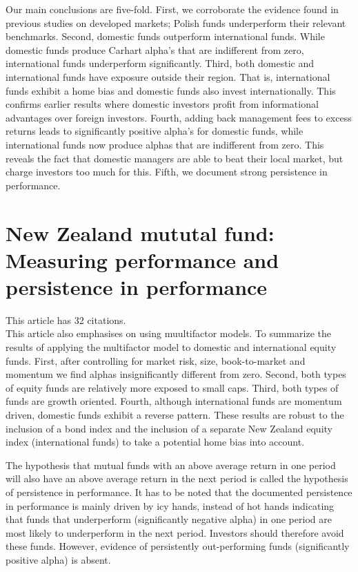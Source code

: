 \documentclass[12 pt]{article}
\begin{document}
\par Our main conclusions are five-fold. First, we corroborate the evidence found in previous studies on developed markets; Polish funds underperform their relevant benchmarks. Second, domestic funds outperform international funds. While domestic funds produce Carhart alpha's that are indifferent from zero, international funds underperform significantly. Third, both domestic and international funds have exposure outside their region. That is, international funds exhibit a home bias and domestic funds also invest internationally. This confirms earlier results where domestic investors profit from informational advantages over foreign investors. Fourth, adding back management fees to excess returns leads to significantly positive alpha's for domestic funds, while international funds now produce alphas that are indifferent from zero. This reveals the fact that domestic managers are able to beat their local market, but charge investors too much for this. Fifth, we document strong persistence in performance. 
\section{New Zealand mututal fund: Measuring performance and persistence in performance}
This article has 32 citations. \\
This article also emphasises on using muultifactor models. To summarize the results of applying the multifactor model to domestic and international equity funds. First, after controlling for market risk, size, book-to-market and momentum we find alphas insignificantly different from zero. Second, both types of equity funds are relatively more exposed to small caps. Third, both types of funds are growth oriented. Fourth, although international funds are momentum driven, domestic funds exhibit a reverse pattern. These results are robust to the inclusion of a bond index and the inclusion of a separate New Zealand equity index (international funds) to take a potential home bias into account.
\par The hypothesis that mutual funds with an above average return in one period will also have an above average return in the next period is called the hypothesis of persistence in performance. It has to be noted that the documented persistence in performance is mainly
driven by icy hands, instead of hot hands indicating that funds that underperform (significantly negative alpha) in one period are most likely to underperform in the next period. Investors should therefore avoid these funds. However, evidence of persistently out-performing funds (significantly positive alpha) is absent. 
\end{document}
